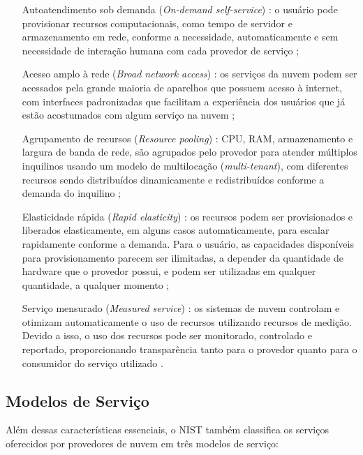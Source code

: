\begin{itemize}
    \item[Autoatendimento sob demanda (\textit{On-demand self-service})]: o usuário pode provisionar recursos computacionais, como tempo de servidor e armazenamento em rede, conforme a necessidade, automaticamente e sem necessidade de interação humana com cada provedor de serviço \cite{mell2011};
    \item[Acesso amplo à rede (\textit{Broad network access})]: os serviços da nuvem podem ser acessados pela grande maioria de aparelhos que possuem acesso à internet, com interfaces padronizadas que facilitam a experiência dos usuários que já estão acostumados com algum serviço na nuvem \cite{mell2011};
    \item[Agrupamento de recursos (\textit{Resource pooling})]: CPU, RAM, armazenamento e largura de banda de rede, são agrupados pelo provedor para atender múltiplos inquilinos usando um modelo de multilocação (\textit{multi-tenant}), com diferentes recursos sendo distribuídos dinamicamente e redistribuídos conforme a demanda do inquilino \cite{mell2011};
    \item[Elasticidade rápida (\textit{Rapid elasticity})]: os recursos podem ser provisionados e liberados elasticamente, em alguns casos automaticamente, para escalar rapidamente conforme a demanda. Para o usuário, as capacidades disponíveis para provisionamento parecem ser ilimitadas, a depender da quantidade de hardware que o provedor possui,  e podem ser utilizadas em qualquer quantidade, a qualquer momento \cite{mell2011};
    \item[Serviço mensurado (\textit{Measured service})]: os sistemas de nuvem controlam e otimizam automaticamente o uso de recursos utilizando recursos de medição. Devido a isso, o uso dos recursos pode ser monitorado, controlado e reportado, proporcionando transparência tanto para o provedor quanto para o consumidor do serviço utilizado \cite{mell2011}.
\end{itemize}

\subsection{Modelos de Serviço}

Além dessas características essenciais, o NIST também classifica os serviços oferecidos por provedores de nuvem em três modelos de serviço:

